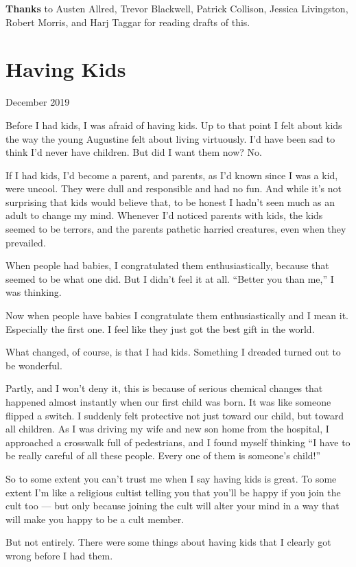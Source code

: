 \documentclass[12pt]{book}
\begin{document}
\textbf{Thanks} to Austen Allred, Trevor Blackwell, Patrick Collison,
Jessica Livingston, Robert Morris, and Harj Taggar for reading drafts of
this.
\chapter{Having Kids}

December 2019

Before I had kids, I was afraid of having kids. Up to that point I felt
about kids the way the young Augustine felt about living virtuously. I'd
have been sad to think I'd never have children. But did I want them now?
No.~

If I had kids, I'd become a parent, and parents, as I'd known since I
was a kid, were uncool. They were dull and responsible and had no fun.
And while it's not surprising that kids would believe that, to be honest
I hadn't seen much as an adult to change my mind. Whenever I'd noticed
parents with kids, the kids seemed to be terrors, and the parents
pathetic harried creatures, even when they prevailed.

When people had babies, I congratulated them enthusiastically, because
that seemed to be what one did. But I didn't feel it at all. ``Better
you than me,'' I was thinking.

Now when people have babies I congratulate them enthusiastically and I
mean it. Especially the first one. I feel like they just got the best
gift in the world.

What changed, of course, is that I had kids. Something I dreaded turned
out to be wonderful.

Partly, and I won't deny it, this is because of serious chemical changes
that happened almost instantly when our first child was born. It was
like someone flipped a switch. I suddenly felt protective not just
toward our child, but toward all children. As I was driving my wife and
new son home from the hospital, I approached a crosswalk full of
pedestrians, and I found myself thinking ``I have to be really careful
of all these people. Every one of them is someone's child!''

So to some extent you can't trust me when I say having kids is great. To
some extent I'm like a religious cultist telling you that you'll be
happy if you join the cult too --- but only because joining the cult
will alter your mind in a way that will make you happy to be a cult
member.

But not entirely. There were some things about having kids that I
clearly got wrong before I had them.
\end{document}
